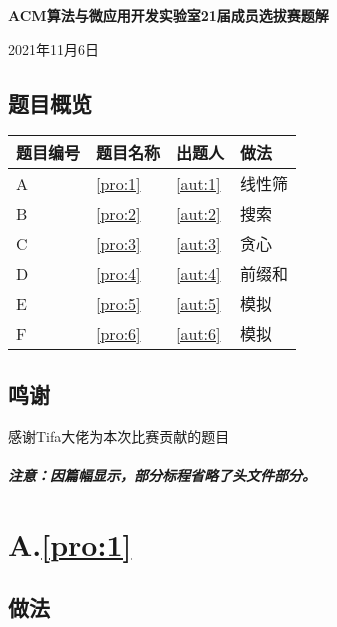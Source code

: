 \documentclass[
	lang=cn,
	color=blue
]{elegantbook}
\begin{document}
\begin{titlepage}
    \begin{center}
		\LARGE
		\textbf{ACM算法与微应用开发实验室21届成员选拔赛题解} \par
		\normalsize
		\vspace{0.5cm}
		2021年11月6日
	\end{center}

    \section*{题目概览}
    \begin{center}
        \begin{tabularx}{\textwidth}{M|M|M|M}
            \toprule
            \textbf{题目编号} & \textbf{题目名称} &\textbf{出题人} & \textbf{做法} \\
            \midrule
            A & \ref*{pro:1} & \ref*{aut:1} &线性筛 \\
            B & \ref*{pro:2} & \ref*{aut:2} &搜索 \\
            C & \ref*{pro:3} & \ref*{aut:3} &贪心 \\
            D & \ref*{pro:4} & \ref*{aut:4} &前缀和 \\
            E & \ref*{pro:5} & \ref*{aut:5} &模拟 \\
            F & \ref*{pro:6} & \ref*{aut:6} &模拟\\
            \bottomrule
        \end{tabularx}
    \end{center}

    \section*{鸣谢}
    感谢Tifa大佬为本次比赛贡献的题目

    \paragraph*{注意：因篇幅显示，部分标程省略了头文件部分。}

\end{titlepage}

\chapter*{A.\quad \ref*{pro:1}}
\section*{做法}
\end{document}
